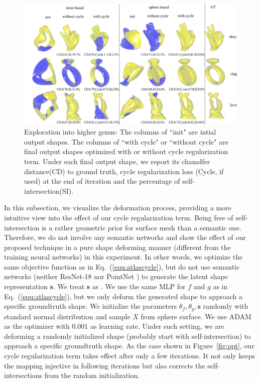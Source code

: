 \begin{figure}
	\centering
	\includegraphics[width=\linewidth]{revision/img/torus/torus}
	\caption{Exploration into higher genus: The columns of ``init"  are intial output shapes. The columns of ``with cycle" or ``without cycle" are final output shapes optimized with or without cycle regularization term. Under each final output shape, we report its chamdfer distance(CD) to ground truth, cycle regularization loss (Cycle, if used) at the end of iteration and the percentage of self-intersection(SI). }
	\label{fig:torus}
\end{figure}
In this subsection, we visualize the deformation process, providing a more intuitive view into the effect of our cycle regularization term. Being free of self-intersection is a rather geometric prior for surface mesh than a semantic one. Therefore, we do not involve any semantic networks and show the effect of our proposed technique in a pure shape deforming manner (different from the training neural networks) in this experiment. In other words, we optimize the same objective function as in Eq.~(\ref{equ:atlascycle}), but do not use semantic networks (neither ResNet-18 \cite{resnet} nor PointNet \cite{pointnet}) to generate the latent shape representation $\mathbf{s}$. We treat $\mathbf{s}$ as . We use the same MLP for $f$ and $g$ as in Eq.~(\ref{equ:atlascycle}), but we only deform the generated shape to approach a specific groundtruth shape. We initialize the parameters $\theta_f,\theta_g,\mathbf{s}$ randomly with standard normal distribution and sample $X$ from sphere surface. We use ADAM \cite{adam} as the optimizer with $0.001$ as learning rate.  Under such setting, we are deforming a randomly initialized shape (probably start with self-intersection) to approach a specific groundtruth shape. As the case shown in Figure~\ref{fig:opt}, our cycle regularization term takes effect after only a few iterations. It not only keeps the mapping injective in following iterations but also corrects the self-intersections from the random initialization.


